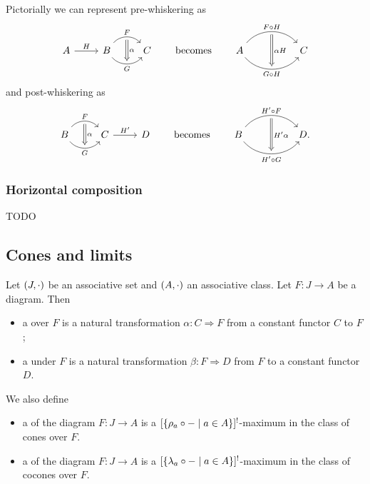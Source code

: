 Pictorially we can represent pre-whiskering as
\[ \begin{tikzcd}
A \arrow[r, "H"] & B \arrow[r, bend left=50, "F"{name=U}]
  \arrow[r, bend right=50, "G"{name=D, below}] & C \arrow[Rightarrow, from=U, to=D, shorten <=0.3em,shorten >=0.3em, "{\alpha}"]
\end{tikzcd} \qquad\text{becomes}\qquad \begin{tikzcd}[column sep=huge]
A \arrow[r, bend left=50, "F\circ H"{name=U}]
  \arrow[r, bend right=50, "G\circ H"{name=D, below}] & C \arrow[Rightarrow, from=U, to=D, shorten <=0.3em,shorten >=0.3em, "{\alpha H}"]
\end{tikzcd} \]
and post-whiskering as
\[ \begin{tikzcd}
B \arrow[r, bend left=50, "F"{name=U}]
  \arrow[r, bend right=50, "G"{name=D, below}] & C \arrow[Rightarrow, from=U, to=D, shorten <=0.3em,shorten >=0.3em, "{\alpha}"] \arrow[r, "{H'}"] & D
\end{tikzcd} \qquad\text{becomes}\qquad \begin{tikzcd}[column sep=huge]
B \arrow[r, bend left=50, "{H'\circ F}"{name=U}]
  \arrow[r, bend right=50, "{H'\circ G}"{name=D, below}] & D \arrow[Rightarrow, from=U, to=D, shorten <=0.3em,shorten >=0.3em, "{H'\alpha}"].
\end{tikzcd} \]

\subsubsection{Horizontal composition}
TODO

\subsection{Cones and limits}
\begin{definition}
Let $\left( J,\cdot \right)$ be an associative set and $\left( A,\cdot \right)$ an associative class. Let $F: J\to A$ be a diagram. Then
\begin{itemize}
\item a  over $F$ is a natural transformation $\alpha: C \Rightarrow F$ from a constant functor $C$ to $F$;
\item a  under $F$ is a natural transformation $\beta: F\Rightarrow D$ from $F$ to a constant functor $D$.
\end{itemize}
We also define
\begin{itemize}
\item a  of the diagram $F: J\to A$ is a $[\left\{ \rho_a\circ - \;\middle|\; a\in A \right\}]^!$-maximum in the class of cones over $F$.
\item a  of the diagram $F: J\to A$ is a $[\left\{ \lambda_a\circ - \;\middle|\; a\in A \right\}]^!$-maximum in the class of cocones over $F$.
\end{itemize}
\end{definition}

